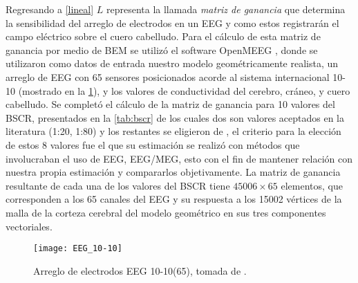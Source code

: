 Regresando a \cref{lineal} $L$ representa la llamada \emph{matriz de ganancia} que determina la sensibilidad del arreglo de electrodos en un EEG y como estos registrarán el campo eléctrico sobre el cuero cabelludo.
Para el cálculo de esta matriz de ganancia por medio de BEM se utilizó el software OpenMEEG \cite{open,open2}, donde se utilizaron como datos de entrada nuestro modelo geométricamente realista, un arreglo de EEG con 65 sensores posicionados acorde al sistema internacional 10-10 (mostrado en la \cref{fig:EEG10-10}), y los valores de conductividad del cerebro, cráneo, y cuero cabelludo.
Se completó el cálculo de la matriz de ganancia para 10 valores del BSCR, presentados en la \cref{tab:bscr} de los cuales dos son valores aceptados en la literatura (1:20, 1:80) y los restantes se eligieron de \cite{McCann2019}, el criterio para la elección de estos 8 valores fue el que su estimación se realizó con métodos que involucraban el uso de EEG, EEG/MEG, esto con el fin de mantener relación con nuestra propia estimación y compararlos objetivamente.
La matriz de ganancia resultante de cada una de los valores del BSCR tiene $45006 \times 65$ elementos,  que corresponden a los 65 canales del EEG y su respuesta a los 15002 vértices de la malla de la corteza cerebral del modelo geométrico en sus tres componentes vectoriales.

\begin{figure}[tbp]
	\centering
	\texttt{[image: EEG\_10-10]}
	\caption{Arreglo de electrodos EEG 10-10(65), tomada de \cite{krolEnglishEEGElectrode2020}.}
	\label{fig:EEG10-10}
\end{figure}

